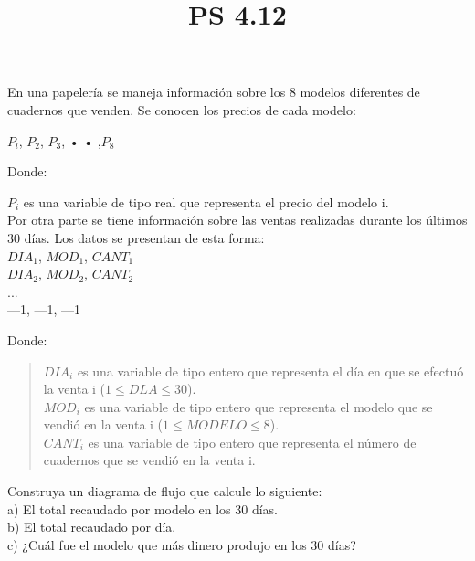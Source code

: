 \documentclass[11pt]{amsart}
\title{PS 4.12}
\begin{document}
\maketitle
\noindent En una papelería se maneja información sobre los 8 modelos diferentes de cuadernos que venden. Se conocen los precios de cada modelo:\\

\begin{center}
$P _{l}$, $P_{2}$, $P_{3}$,  • • ,$P_{8}$
\end{center}

\noindent Donde:

\begin{center}
$P_{i}$ es una variable de tipo real que representa el precio del modelo i.\\

Por otra parte se tiene información sobre las ventas realizadas durante los últimos 30 días. Los datos se presentan de esta forma:\\

$DIA _{1}$, $MOD_{1}$, $CANT_{1}$\\
$DIA_{2}$, $MOD_{2}$, $CANT_{2}$\\
...\\
—1, —1, —1
\end{center}

\noindent Donde:
\begin{quote}
$DIA_{i}$ es una variable de tipo entero que representa el día en que se efectuó la venta i ($1 \leq DLA \leq 30$).\\
$MOD_{i}$ es una variable de tipo entero que representa el modelo que se vendió en la venta i ($1 \leq MODELO \leq 8$).\\
$CANT_{i}$ es una variable de tipo entero que representa el número de cuadernos que se vendió en la venta i.\\
\end{quote}


\noindent Construya un diagrama de flujo que calcule lo siguiente:\\


a) El total recaudado por modelo en los 30 días.\\
b) El total recaudado por día.\\
c) ¿Cuál fue el modelo que más dinero produjo en los 30 días?
\end{document}
